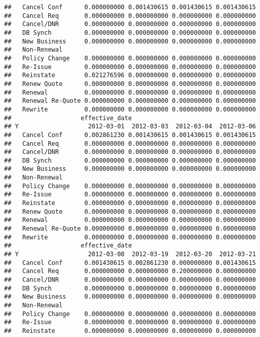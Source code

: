 \documentclass[]{article}
\begin{document}
\begin{verbatim}
##   Cancel Conf      0.000000000 0.001430615 0.001430615 0.001430615
##   Cancel Req       0.000000000 0.000000000 0.000000000 0.000000000
##   Cancel/DNR       0.000000000 0.000000000 0.000000000 0.000000000
##   DB Synch         0.000000000 0.000000000 0.000000000 0.000000000
##   New Business     0.000000000 0.000000000 0.000000000 0.000000000
##   Non-Renewal                                                     
##   Policy Change    0.000000000 0.000000000 0.000000000 0.000000000
##   Re-Issue         0.000000000 0.000000000 0.000000000 0.000000000
##   Reinstate        0.021276596 0.000000000 0.000000000 0.000000000
##   Renew Quote      0.000000000 0.000000000 0.000000000 0.000000000
##   Renewal          0.000000000 0.000000000 0.000000000 0.000000000
##   Renewal Re-Quote 0.000000000 0.000000000 0.000000000 0.000000000
##   Rewrite          0.000000000 0.000000000 0.000000000 0.000000000
##                   effective_date
## Y                   2012-03-01  2012-03-03  2012-03-04  2012-03-06
##   Cancel Conf      0.002861230 0.001430615 0.001430615 0.001430615
##   Cancel Req       0.000000000 0.000000000 0.000000000 0.000000000
##   Cancel/DNR       0.000000000 0.000000000 0.000000000 0.000000000
##   DB Synch         0.000000000 0.000000000 0.000000000 0.000000000
##   New Business     0.000000000 0.000000000 0.000000000 0.000000000
##   Non-Renewal                                                     
##   Policy Change    0.000000000 0.000000000 0.000000000 0.000000000
##   Re-Issue         0.000000000 0.000000000 0.000000000 0.000000000
##   Reinstate        0.000000000 0.000000000 0.000000000 0.000000000
##   Renew Quote      0.000000000 0.000000000 0.000000000 0.000000000
##   Renewal          0.000000000 0.000000000 0.000000000 0.000000000
##   Renewal Re-Quote 0.000000000 0.000000000 0.000000000 0.000000000
##   Rewrite          0.000000000 0.000000000 0.000000000 0.000000000
##                   effective_date
## Y                   2012-03-08  2012-03-19  2012-03-20  2012-03-21
##   Cancel Conf      0.001430615 0.002861230 0.000000000 0.001430615
##   Cancel Req       0.000000000 0.000000000 0.200000000 0.000000000
##   Cancel/DNR       0.000000000 0.000000000 0.000000000 0.000000000
##   DB Synch         0.000000000 0.000000000 0.000000000 0.000000000
##   New Business     0.000000000 0.000000000 0.000000000 0.000000000
##   Non-Renewal                                                     
##   Policy Change    0.000000000 0.000000000 0.000000000 0.000000000
##   Re-Issue         0.000000000 0.000000000 0.000000000 0.000000000
##   Reinstate        0.000000000 0.000000000 0.000000000 0.000000000

\end{verbatim}
\end{document}
